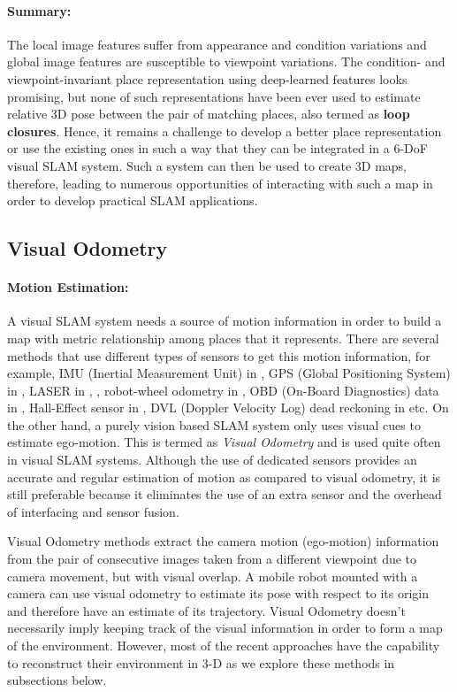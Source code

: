 \documentclass{article}
\begin{document}
\paragraph{Summary:}
The local image features suffer from appearance and condition variations and global image features are susceptible to viewpoint variations. The condition- and viewpoint-invariant place representation using deep-learned features looks promising, but none of such representations have been ever used to estimate relative 3D pose between the pair of matching places, also termed as \textbf{loop closures}. Hence, it remains a challenge to develop a better place representation or use the existing ones in such a way that they can be integrated in a 6-DoF visual SLAM system. Such a system can then be used to create 3D maps, therefore, leading to numerous opportunities of interacting with such a map in order to develop practical SLAM applications. 

\subsection{Visual Odometry}
\paragraph{Motion Estimation:} A visual SLAM system needs a source of motion information in order to build a map with metric relationship among places that it represents. There are several methods that use different types of sensors to get this motion information, for example, IMU (Inertial Measurement Unit) in \cite{Kneip2011, Milford2014}, GPS (Global Positioning System) in \cite{Agrawal2006, Floros2013}, LASER in \cite{Kohlbrecher2011}, \cite{Paul2010}, robot-wheel odometry in \cite{Bazeille2011}, OBD (On-Board Diagnostics) data in \cite{pepperell2015automatic,Pepperell2014}, Hall-Effect sensor in \cite{Pepperell2014}, DVL (Doppler Velocity Log) dead reckoning in \cite{Mahon2008} etc. On the other hand, a purely vision based SLAM system only uses visual cues to estimate ego-motion. This is termed as \emph{Visual Odometry} and is used quite often in visual SLAM systems. Although the use of dedicated sensors provides an accurate and regular estimation of motion as compared to visual odometry, it is still preferable because it eliminates the use of an extra sensor and the overhead of interfacing and sensor fusion.

Visual Odometry methods extract the camera motion (ego-motion) information from the pair of consecutive images taken from a different viewpoint due to camera movement, but with visual overlap. A mobile robot mounted with a camera can use visual odometry to estimate its pose with respect to its origin and therefore have an estimate of its trajectory. Visual Odometry doesn't necessarily imply keeping track of the visual information in order to form a map of the environment. However, most of the recent approaches have the capability to reconstruct their environment in 3-D as we explore these methods in subsections below.
\end{document}
